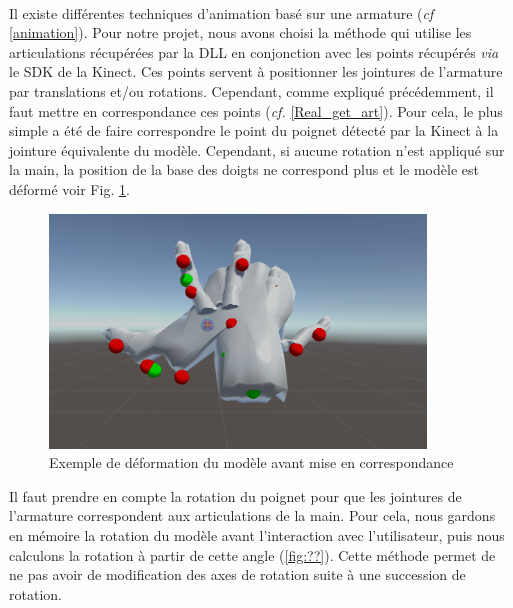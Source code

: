 \paragraph{} 
Il existe différentes techniques d'animation basé sur une armature (\textit{cf} \ref{animation}).
Pour notre projet, nous avons choisi la méthode qui utilise les articulations récupérées par la DLL en conjonction avec les points récupérés \textit{via} le SDK de la Kinect. Ces points servent à positionner les jointures de l'armature par translations et/ou rotations.
Cependant, comme expliqué précédemment, il faut mettre en correspondance ces points (\textit{cf.} \ref{Real_get_art}).
Pour cela, le plus simple a été de faire correspondre le point du poignet détecté par la Kinect à la jointure équivalente du modèle.
Cependant, si aucune rotation n'est appliqué sur la main, la position de la base des doigts ne correspond plus et le modèle est déformé voir Fig. \ref{fig:badhand}.

\begin{figure}
	\label{fig:badhand}
	\centering
	\includegraphics[width=10cm]{images/BadHand.png}
	\caption{Exemple de déformation du modèle avant mise en correspondance}	
\end{figure}

Il faut prendre en compte la rotation du poignet pour que les jointures de l'armature correspondent aux articulations de la main. 
Pour cela, nous gardons en mémoire la rotation du modèle avant l'interaction avec l'utilisateur,
puis nous calculons la rotation à partir de cette angle (\ref{fig:??}). Cette méthode permet de ne pas avoir de modification des axes de rotation suite à une succession de rotation.

%
